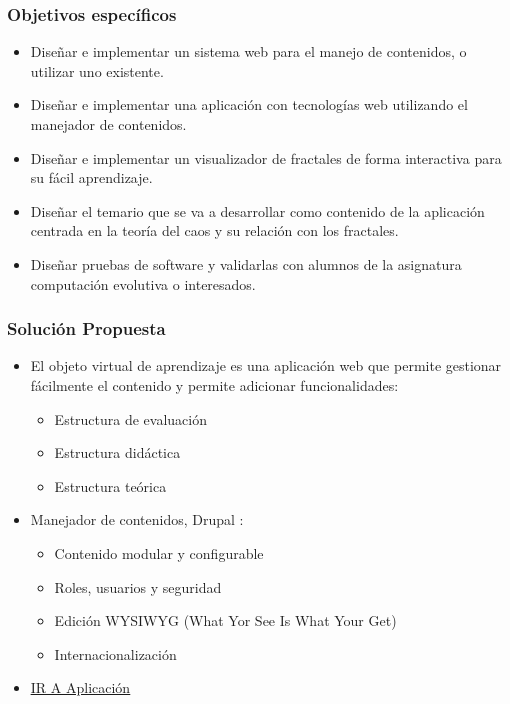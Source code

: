 \documentclass{beamer}
\begin{document}
\begin{frame}[label=OBJETIVOS]
  \frametitle{Objetivos específicos}
    \begin{itemize}
      \item <1>Diseñar e implementar un sistema web para el manejo de contenidos, o utilizar uno existente. \hyperlink{DRUPAL}{}
      \item <2>Diseñar e implementar una aplicación con tecnologías web utilizando el manejador de contenidos. \hyperlink{EVA}{}
      \item <3>Diseñar e implementar un visualizador de fractales de forma interactiva para su fácil aprendizaje.\hyperlink{FRACTAL}{}
      \item <4>Diseñar el temario que se va a desarrollar como contenido de la aplicación centrada en la teoría del caos y su relación con los fractales. \hyperlink{CAOS}{}
      \item <5>Diseñar pruebas de software y validarlas con alumnos de la asignatura computación evolutiva o interesados. \hyperlink{PRUEBA}{}
    \end{itemize}
  \hypertarget<1>{OODRUPAL}{}
  \hypertarget<2>{OOEVA}{}
  \hypertarget<3>{OOFRACTAL}{}
  \hypertarget<4>{OOCAOS}{}
  \hypertarget<5>{OOPRUEBA}{}
\end{frame}

\begin{frame} [label=DRUPAL]
  \frametitle{Solución Propuesta}  
  \begin{itemize} 
  \item <1> El objeto virtual de aprendizaje es una aplicación web que permite gestionar fácilmente el contenido y permite adicionar funcionalidades: 
    \begin{itemize}
      \item Estructura de evaluación
      \item Estructura didáctica
      \item Estructura teórica
    \end{itemize}
  \item <2> Manejador de contenidos, Drupal :
    \begin{itemize}
      \item Contenido modular y configurable
      \item Roles, usuarios y seguridad
      \item Edición WYSIWYG (What Yor See Is What Your Get)
      \item Internacionalización
    \end{itemize}
  \item <2> \underline{\href{http://127.0.0.1/?q=es/node/3}{IR A Aplicación}} \hyperlink{OODRUPAL}{}
  \end{itemize}

\end{frame}
\end{document}
